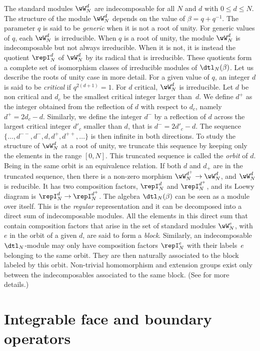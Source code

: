 \documentclass[11pt]{article}
\numberwithin{equation}{section}
\theoremstyle{alexi}
\renewcommand{\leq}{\leqslant}
\begin{document}
The standard modules $\wW_N^d$ are indecomposable for all $N$ and $d$ with $0\leq d\leq N$. The structure of the module $\wW_N^d$ depends on the value of $\beta = q+q^{-1}$. The parameter $q$ is said to be {\em generic} when it is not a root of unity. For generic values of $q$, each $\wW_N^d$ is irreducible. When $q$ is a root of unity, the module $\wW_N^d$ is indecomposable but not always irreducible. When it is not, it is instead the quotient $\repI_N^d$ of $\wW_N^d$ by its radical that is irreducible. These quotients form a complete set of isomorphism classes of irreducible modules of $\dtl_N(\beta)$. Let us describe the roots of unity case in more detail. For a given value of $q$, an integer $d$ is said to be {\em critical} if $q^{2(d+1)}=1$. For $d$ critical, $\wW_N^d$ is irreducible. Let $d$ be non critical and $d_c$ be the smallest critical integer larger than~$d$. We define $d^+$ as the integer obtained from the reflection of $d$ with respect to $d_c$, namely $d^+=2d_c-d$. Similarly, we define the integer $d^-$ by a reflection of $d$ across the largest critical integer $d'_c$ smaller than $d$, that is $d^-=2d'_c-d$. The sequence $\{\dots, d^{--}, d^-,d,d^+,d^{++},\dots\}$ is then infinite in both directions. To study the structure of $\wW_N^d$ at a root of unity, we truncate this sequence by keeping only the elements in the range $[0,N]$. This truncated sequence is called the {\em orbit} of $d$. Being in the same orbit is an equivalence relation. If both $d$ and $d_+$ are in the truncated sequence, then there is a non-zero morphism $\wW_N^{d^+}\to \wW_N^d$, and $\wW_N^d$ is reducible. It has two composition factors, $\repI_N^d$ and $\repI_N^{d^+}$, and its Loewy diagram is $\repI_N^d \to \repI_N^{d^+}$. The algebra $\dtl_N(\beta)$ can be seen as a module over itself. This is the {\em regular} representation and it can be decomposed into a direct sum of indecomposable modules. All the elements in this direct sum that contain composition factors that arise in the set of standard modules $\wW_N^e$, with $e$ in the orbit of a given $d$, are said to form a {\it block}. Similarly, an indecomposable $\dtl_N$-module may only have composition factors $\repI_N^{e}$ with their labels~$e$ belonging to the same orbit. They are then naturally associated to the block labeled by this orbit. Non-trivial homomorphism and extension groups exist only between the indecomposables associated to the same block. (See \cite{JBYSA13} for more details.) 


%
\section{Integrable face and boundary operators} \label{sec:faceAndBoundary}
%
\end{document}
